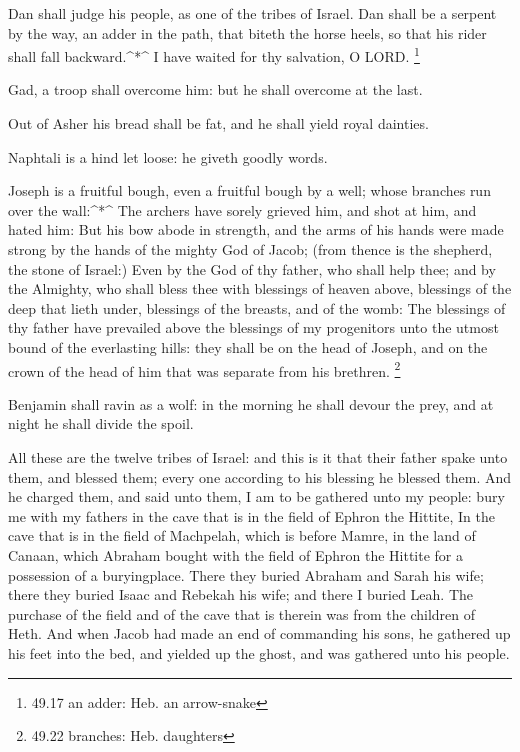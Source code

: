  Dan shall judge his people, as one of the tribes of
Israel.  Dan shall be a serpent by the way, an adder in the
path, that biteth the horse heels, so that his rider shall fall
backward.\^{}*\^{}  I have waited for thy salvation, O
LORD. \footnote{49.17 an adder: Heb. an arrow-snake}

 Gad, a troop shall overcome him: but he shall overcome at
the last.

 Out of Asher his bread shall be fat, and he shall yield
royal dainties.

 Naphtali is a hind let loose: he giveth goodly words.

 Joseph is a fruitful bough, even a fruitful bough by a
well; whose branches run over the wall:\^{}*\^{}  The
archers have sorely grieved him, and shot at him, and hated him:
 But his bow abode in strength, and the arms of his hands
were made strong by the hands of the mighty God of Jacob; (from thence
is the shepherd, the stone of Israel:)  Even by the God of
thy father, who shall help thee; and by the Almighty, who shall bless
thee with blessings of heaven above, blessings of the deep that lieth
under, blessings of the breasts, and of the womb:  The
blessings of thy father have prevailed above the blessings of my
progenitors unto the utmost bound of the everlasting hills: they shall
be on the head of Joseph, and on the crown of the head of him that was
separate from his brethren. \footnote{49.22 branches: Heb. daughters}

 Benjamin shall ravin as a wolf: in the morning he shall
devour the prey, and at night he shall divide the spoil.

 All these are the twelve tribes of Israel: and this is it
that their father spake unto them, and blessed them; every one according
to his blessing he blessed them.  And he charged them, and
said unto them, I am to be gathered unto my people: bury me with my
fathers in the cave that is in the field of Ephron the Hittite,
 In the cave that is in the field of Machpelah, which is
before Mamre, in the land of Canaan, which Abraham bought with the field
of Ephron the Hittite for a possession of a buryingplace. 
There they buried Abraham and Sarah his wife; there they buried Isaac
and Rebekah his wife; and there I buried Leah.  The
purchase of the field and of the cave that is therein was from the
children of Heth.  And when Jacob had made an end of
commanding his sons, he gathered up his feet into the bed, and yielded
up the ghost, and was gathered unto his people.

